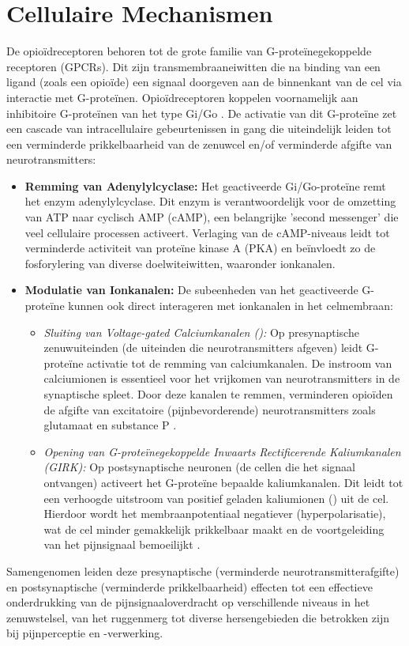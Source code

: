 \documentclass[11pt, a4paper]{report} %
\begin{document}
\section{Cellulaire Mechanismen}
De opioïdreceptoren behoren tot de grote familie van G-proteïnegekoppelde receptoren (GPCRs). Dit zijn transmembraaneiwitten die na binding van een ligand (zoals een opioïde) een signaal doorgeven aan de binnenkant van de cel via interactie met G-proteïnen. Opioïdreceptoren koppelen voornamelijk aan inhibitoire G-proteïnen van het type Gi/Go \parencite{Gupta2010ChemistryOpioids, StatPearlsOpioidReceptor}. De activatie van dit G-proteïne zet een cascade van intracellulaire gebeurtenissen in gang die uiteindelijk leiden tot een verminderde prikkelbaarheid van de zenuwcel en/of verminderde afgifte van neurotransmitters:
\begin{itemize}
    \item \textbf{Remming van Adenylylcyclase:} Het geactiveerde Gi/Go-proteïne remt het enzym adenylylcyclase. Dit enzym is verantwoordelijk voor de omzetting van ATP naar cyclisch AMP (cAMP), een belangrijke 'second messenger' die veel cellulaire processen activeert. Verlaging van de cAMP-niveaus leidt tot verminderde activiteit van proteïne kinase A (PKA) en beïnvloedt zo de fosforylering van diverse doelwiteiwitten, waaronder ionkanalen.
    \item \textbf{Modulatie van Ionkanalen:} De subeenheden van het geactiveerde G-proteïne kunnen ook direct interageren met ionkanalen in het celmembraan:
        \begin{itemize}
            \item \textit{Sluiting van Voltage-gated Calciumkanalen ():} Op presynaptische zenuwuiteinden (de uiteinden die neurotransmitters afgeven) leidt G-proteïne activatie tot de remming van calciumkanalen. De instroom van calciumionen is essentieel voor het vrijkomen van neurotransmitters in de synaptische spleet. Door deze kanalen te remmen, verminderen opioïden de afgifte van excitatoire (pijnbevorderende) neurotransmitters zoals glutamaat en substance P \parencite{StatPearlsOpioidReceptor}.
            \item \textit{Opening van G-proteïnegekoppelde Inwaarts Rectificerende Kaliumkanalen (GIRK):} Op postsynaptische neuronen (de cellen die het signaal ontvangen) activeert het G-proteïne bepaalde kaliumkanalen. Dit leidt tot een verhoogde uitstroom van positief geladen kaliumionen () uit de cel. Hierdoor wordt het membraanpotentiaal negatiever (hyperpolarisatie), wat de cel minder gemakkelijk prikkelbaar maakt en de voortgeleiding van het pijnsignaal bemoeilijkt \parencite{StatPearlsOpioidReceptor}.
        \end{itemize}
\end{itemize}
Samengenomen leiden deze presynaptische (verminderde neurotransmitterafgifte) en postsynaptische (verminderde prikkelbaarheid) effecten tot een effectieve onderdrukking van de pijnsignaaloverdracht op verschillende niveaus in het zenuwstelsel, van het ruggenmerg tot diverse hersengebieden die betrokken zijn bij pijnperceptie en -verwerking.
\end{document}
